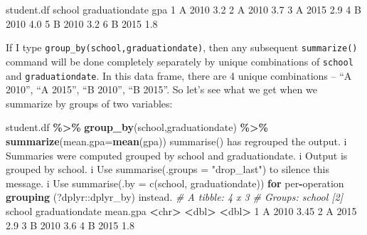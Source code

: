 \documentclass[
]{book}
\newenvironment{Shaded}{\begin{snugshade}}{\end{snugshade}}
\newcommand{\AttributeTok}[1]{\textcolor[rgb]{0.13,0.29,0.53}{#1}}
\newcommand{\CommentTok}[1]{\textcolor[rgb]{0.56,0.35,0.01}{\textit{#1}}}
\newcommand{\ControlFlowTok}[1]{\textcolor[rgb]{0.13,0.29,0.53}{\textbf{#1}}}
\newcommand{\DecValTok}[1]{\textcolor[rgb]{0.00,0.00,0.81}{#1}}
\newcommand{\ErrorTok}[1]{\textcolor[rgb]{0.64,0.00,0.00}{\textbf{#1}}}
\newcommand{\FloatTok}[1]{\textcolor[rgb]{0.00,0.00,0.81}{#1}}
\newcommand{\FunctionTok}[1]{\textcolor[rgb]{0.13,0.29,0.53}{\textbf{#1}}}
\newcommand{\NormalTok}[1]{#1}
\newcommand{\SpecialCharTok}[1]{\textcolor[rgb]{0.81,0.36,0.00}{\textbf{#1}}}
\newcommand{\StringTok}[1]{\textcolor[rgb]{0.31,0.60,0.02}{#1}}
\begin{document}
\begin{Shaded}
\begin{Highlighting}[]
\NormalTok{student.df}
\NormalTok{  school graduationdate gpa}
\DecValTok{1}\NormalTok{      A           }\DecValTok{2010} \FloatTok{3.2}
\DecValTok{2}\NormalTok{      A           }\DecValTok{2010} \FloatTok{3.7}
\DecValTok{3}\NormalTok{      A           }\DecValTok{2015} \FloatTok{2.9}
\DecValTok{4}\NormalTok{      B           }\DecValTok{2010} \FloatTok{4.0}
\DecValTok{5}\NormalTok{      B           }\DecValTok{2010} \FloatTok{3.2}
\DecValTok{6}\NormalTok{      B           }\DecValTok{2015} \FloatTok{1.8}
\end{Highlighting}
\end{Shaded}

If I type \texttt{group\_by(school,graduationdate)}, then any subsequent \texttt{summarize()} command will be done completely separately by unique combinations of \texttt{school} and \texttt{graduationdate}. In this data frame, there are 4 unique combinations -- ``A 2010'', ``A 2015'', ``B 2010'', ``B 2015''. So let's see what we get when we summarize by groups of two variables:

\begin{Shaded}
\begin{Highlighting}[]
\NormalTok{student.df }\SpecialCharTok{\%\textgreater{}\%} 
  \FunctionTok{group\_by}\NormalTok{(school,graduationdate) }\SpecialCharTok{\%\textgreater{}\%}
  \FunctionTok{summarize}\NormalTok{(}\AttributeTok{mean.gpa=}\FunctionTok{mean}\NormalTok{(gpa))}
\StringTok{\textasciigrave{}}\AttributeTok{summarise()}\StringTok{\textasciigrave{}}\NormalTok{ has regrouped the output.}
\NormalTok{i Summaries were computed grouped by school and}
\NormalTok{  graduationdate.}
\NormalTok{i Output is grouped by school.}
\NormalTok{i Use }\StringTok{\textasciigrave{}}\AttributeTok{summarise(.groups = "drop\_last")}\StringTok{\textasciigrave{}}\NormalTok{ to silence this}
\NormalTok{  message.}
\NormalTok{i Use }\StringTok{\textasciigrave{}}\AttributeTok{summarise(.by = c(school, graduationdate))}\StringTok{\textasciigrave{}} \ControlFlowTok{for}
\NormalTok{  per}\SpecialCharTok{{-}}\NormalTok{operation }\FunctionTok{grouping}\NormalTok{ (}\StringTok{\textasciigrave{}}\AttributeTok{?dplyr::dplyr\_by}\StringTok{\textasciigrave{}}\NormalTok{) instead.}
\CommentTok{\# A tibble: 4 x 3}
\CommentTok{\# Groups:   school [2]}
\NormalTok{  school graduationdate mean.gpa}
  \SpecialCharTok{\textless{}}\NormalTok{chr}\SpecialCharTok{\textgreater{}}           \ErrorTok{\textless{}}\NormalTok{dbl}\SpecialCharTok{\textgreater{}}    \ErrorTok{\textless{}}\NormalTok{dbl}\SpecialCharTok{\textgreater{}}
\DecValTok{1}\NormalTok{ A                }\DecValTok{2010}     \FloatTok{3.45}
\DecValTok{2}\NormalTok{ A                }\DecValTok{2015}     \FloatTok{2.9} 
\DecValTok{3}\NormalTok{ B                }\DecValTok{2010}     \FloatTok{3.6} 
\DecValTok{4}\NormalTok{ B                }\DecValTok{2015}     \FloatTok{1.8} 
\end{Highlighting}
\end{Shaded}
\end{document}
